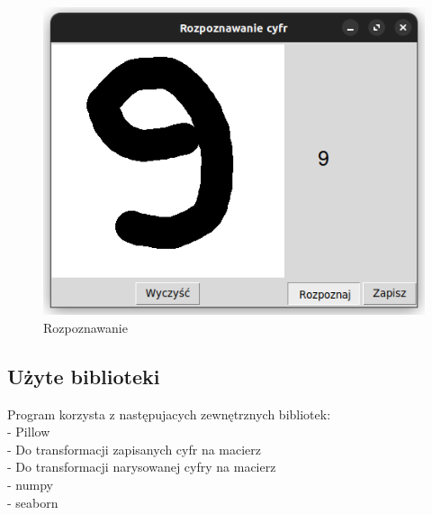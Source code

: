 \documentclass[12pt,a4paper]{article}
\begin{document}
\begin{figure}[!h]
	\includegraphics{"app2.png"}
	\centering
	\caption{Rozpoznawanie}
\end{figure}
\subsection{Użyte biblioteki}
Program korzysta z następujacych zewnętrznych bibliotek:\\
- Pillow\\
\indent - Do transformacji zapisanych cyfr na macierz\\
\indent - Do transformacji narysowanej cyfry na macierz\\
- numpy\\
- seaborn
\end{document}

